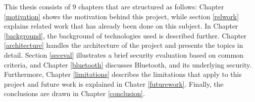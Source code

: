 This thesis consists of 9 chapters that are structured as follows: Chapter \ref{motivation} shows the motivation behind this project, while section \ref{relwork} explains related work that has already been done on this subject. In Chapter \ref{background}, the background of technologies used is described further. Chapter \ref{architecture} handles the architecture of the project and presents the topics in detail. Section \ref{seceval} illustrates a brief security evaluation based on common criteria, and Chapter \ref{bluetooth} discusses Bluetooth, and its underlying security. Furthermore, Chapter \ref{limitations} describes the limitations that apply to this project and future work is explained in Chater \ref{futurework}. Finally, the conclusions are drawn in Chapter \ref{conclusion}.

